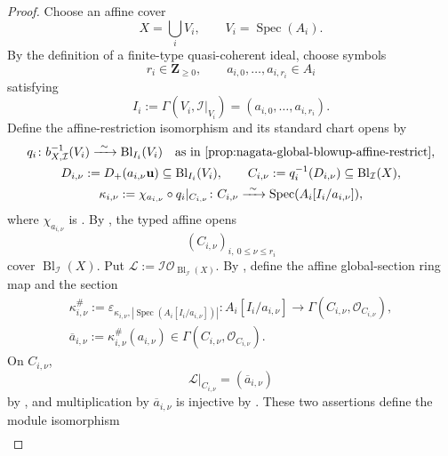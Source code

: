 \begin{proof}
  \leanok
  Choose an affine cover
  \[
    X=\bigcup_iV_i,\qquad V_i=\operatorname{Spec}(A_i).
  \]
  By the definition of a finite-type quasi-coherent ideal, choose symbols
  \[
    r_i\in\mathbf Z_{\ge0},\qquad
    a_{i,0},\ldots,a_{i,r_i}\in A_i
  \]
  satisfying
  \[
    I_i:=\Gamma(V_i,\mathcal I|_{V_i})
      =(a_{i,0},\ldots,a_{i,r_i}).
  \]
  Define the affine-restriction isomorphism and its standard chart opens by
  \[
  \begin{gathered}
    q_i\colon b_{X,\mathcal I}^{-1}(V_i)
      \xrightarrow{\ \sim\ }\operatorname{Bl}_{I_i}(V_i)
      \quad\text{as in \Cref{prop:nagata-global-blowup-affine-restrict}},\\
    D_{i,\nu}:=D_+(a_{i,\nu}\mathbf u)
      \subseteq\operatorname{Bl}_{I_i}(V_i),\qquad
    C_{i,\nu}:=q_i^{-1}(D_{i,\nu})
      \subseteq\operatorname{Bl}_{\mathcal I}(X),\\
    \kappa_{i,\nu}:=
      \chi_{a_{i,\nu}}\circ q_i|_{C_{i,\nu}}\colon
      C_{i,\nu}\xrightarrow{\ \sim\ }
      \operatorname{Spec}(A_i[I_i/a_{i,\nu}]),
  \end{gathered}
  \]
  where $\chi_{a_{i,\nu}}$ is
  .  By
  , the typed affine opens
  \[
    (C_{i,\nu})_{i,\ 0\leq\nu\leq r_i}
  \]
  cover $\operatorname{Bl}_{\mathcal I}(X)$.  Put
  $\mathcal L:=\mathcal I\mathcal O_{\operatorname{Bl}_{\mathcal I}(X)}$.
  By , define the affine
  global-section ring map and the section
  \[
  \begin{gathered}
    \kappa_{i,\nu}^{\#}
      :=\varepsilon_{\kappa_{i,\nu},
        |\operatorname{Spec}(A_i[I_i/a_{i,\nu}])|}\colon
      A_i[I_i/a_{i,\nu}]\longrightarrow
        \Gamma(C_{i,\nu},\mathcal O_{C_{i,\nu}}),\\
    \overline a_{i,\nu}:=
      \kappa_{i,\nu}^{\#}(a_{i,\nu})
      \in\Gamma(C_{i,\nu},\mathcal O_{C_{i,\nu}}).
  \end{gathered}
  \]
  On $C_{i,\nu}$,
  \[
    \mathcal L|_{C_{i,\nu}}=(\overline a_{i,\nu})
  \]
  by , and multiplication
  by $\overline a_{i,\nu}$ is injective by
  .  These two assertions define
  the module isomorphism
  \[
  \begin{aligned}

\end{aligned}\]
\end{proof}
